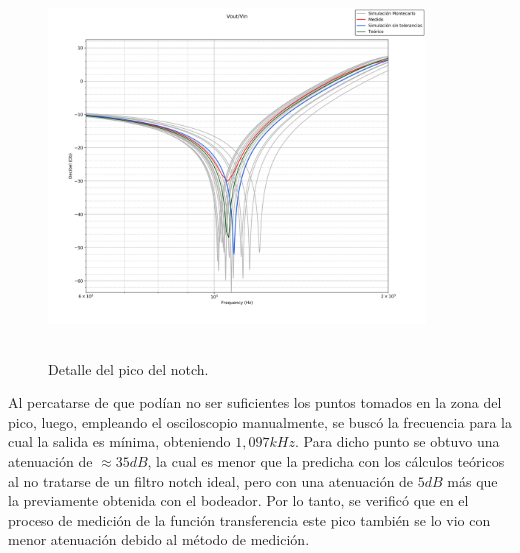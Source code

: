 \begin{figure}[H] %
	\centering
	\includegraphics[width=10cm,height=10cm,keepaspectratio]{../EJ1/00GRAFICOS/pico.png}
	\caption{Detalle del pico del notch.}
	\label{pico}
\end{figure}

Al percatarse de que pod\'ian no ser suficientes los puntos tomados en la zona del pico, luego, empleando el osciloscopio manualmente, se busc\'o la frecuencia para la cual la salida es m\'inima, obteniendo $1,097kHz$. Para dicho punto se obtuvo una atenuaci\'on de $\approx35dB$, la cual es menor que la predicha con los c\'alculos te\'oricos al no tratarse de un filtro notch ideal, pero con una atenuaci\'on de $5dB$ m\'as que la previamente obtenida con el bodeador. Por lo tanto, se verific\'o que en el proceso de medici\'on de la funci\'on transferencia este pico tambi\'en se lo vio con menor atenuaci\'on debido al m\'etodo de medici\'on.

